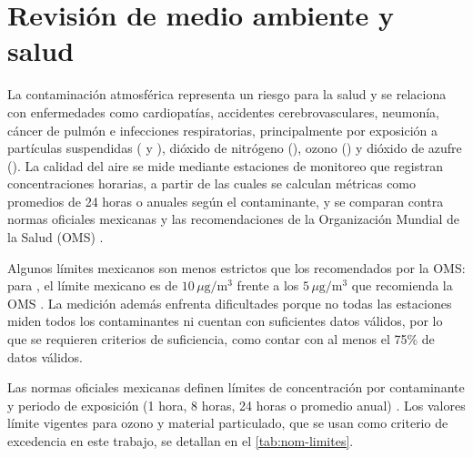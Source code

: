 \section{Revisión de medio ambiente y salud}
\label{sec:revi-medio-ambiente}

La contaminación atmosférica representa un riesgo para la salud y se
relaciona con enfermedades como cardiopatías, accidentes cerebrovasculares,
neumonía, cáncer de pulmón e infecciones respiratorias, principalmente por
exposición a partículas suspendidas ( y ), dióxido de
nitrógeno (), ozono () y dióxido de azufre (). La
calidad del aire se mide mediante estaciones de monitoreo que registran
concentraciones horarias, a partir de las cuales se calculan métricas como
promedios de 24 horas o anuales según el contaminante, y se comparan contra
normas oficiales mexicanas y las recomendaciones de la Organización Mundial
de la Salud (OMS) \parencite{oms2021}.

Algunos límites mexicanos son menos estrictos que los recomendados por la
OMS: para , el límite mexicano es de
$10\,\mu\mathrm{g}/\mathrm{m}^{3}$ frente a los $5\,\mu\mathrm{g}/\mathrm{m}^{3}$
que recomienda la OMS \parencite{oms2021}. La medición además enfrenta
dificultades porque no todas las estaciones miden todos los contaminantes ni
cuentan con suficientes datos válidos, por lo que se requieren criterios de
suficiencia, como contar con al menos el 75\% de datos válidos.

Las normas oficiales mexicanas definen límites de concentración por
contaminante y periodo de exposición (1 hora, 8 horas, 24 horas o
promedio anual) \parencite{nlAirenlgobmxNormatividad, NOMCalidadAireAmbiente}.
Los valores límite vigentes para ozono y material particulado, que se usan
como criterio de excedencia en este trabajo, se detallan en el
\cref{tab:nom-limites}.
